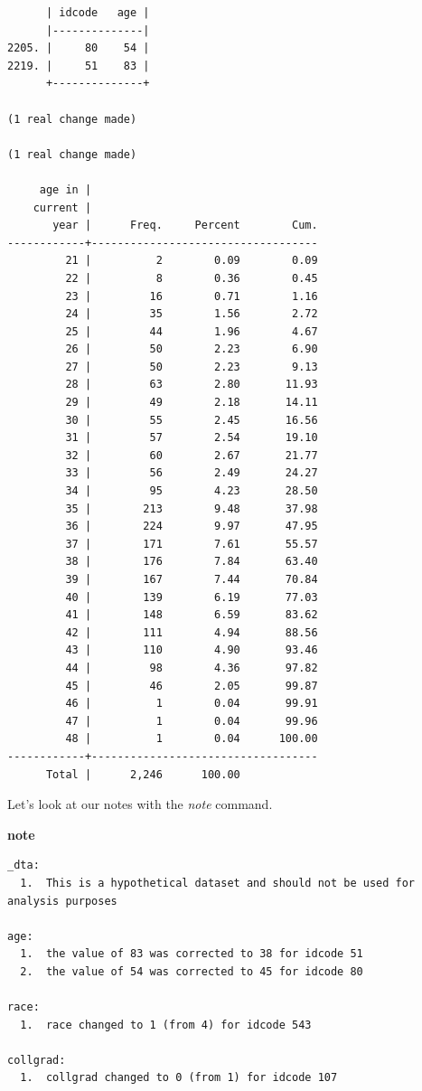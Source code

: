 \documentclass[
]{book}
\newenvironment{Shaded}{\begin{snugshade}}{\end{snugshade}}
\newcommand{\KeywordTok}[1]{\textcolor[rgb]{0.13,0.29,0.53}{\textbf{#1}}}
\begin{document}
\begin{verbatim}
      | idcode   age |
      |--------------|
2205. |     80    54 |
2219. |     51    83 |
      +--------------+

(1 real change made)

(1 real change made)

     age in |
    current |
       year |      Freq.     Percent        Cum.
------------+-----------------------------------
         21 |          2        0.09        0.09
         22 |          8        0.36        0.45
         23 |         16        0.71        1.16
         24 |         35        1.56        2.72
         25 |         44        1.96        4.67
         26 |         50        2.23        6.90
         27 |         50        2.23        9.13
         28 |         63        2.80       11.93
         29 |         49        2.18       14.11
         30 |         55        2.45       16.56
         31 |         57        2.54       19.10
         32 |         60        2.67       21.77
         33 |         56        2.49       24.27
         34 |         95        4.23       28.50
         35 |        213        9.48       37.98
         36 |        224        9.97       47.95
         37 |        171        7.61       55.57
         38 |        176        7.84       63.40
         39 |        167        7.44       70.84
         40 |        139        6.19       77.03
         41 |        148        6.59       83.62
         42 |        111        4.94       88.56
         43 |        110        4.90       93.46
         44 |         98        4.36       97.82
         45 |         46        2.05       99.87
         46 |          1        0.04       99.91
         47 |          1        0.04       99.96
         48 |          1        0.04      100.00
------------+-----------------------------------
      Total |      2,246      100.00
\end{verbatim}

Let's look at our notes with the \emph{note} command.

\begin{Shaded}
\begin{Highlighting}[]
\KeywordTok{note}
\end{Highlighting}
\end{Shaded}

\begin{verbatim}
_dta:
  1.  This is a hypothetical dataset and should not be used for analysis purposes

age:
  1.  the value of 83 was corrected to 38 for idcode 51
  2.  the value of 54 was corrected to 45 for idcode 80

race:
  1.  race changed to 1 (from 4) for idcode 543

collgrad:
  1.  collgrad changed to 0 (from 1) for idcode 107
\end{verbatim}
\end{document}
